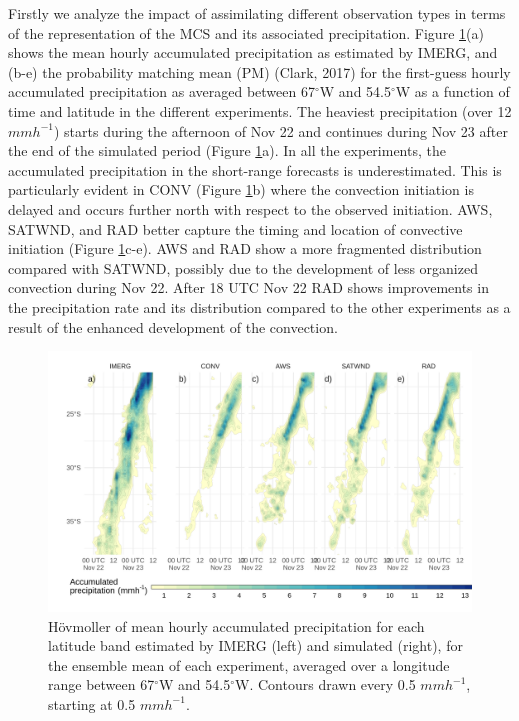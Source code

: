 \documentclass[final,5p,times,twocolumn,authoryear]{elsarticle} %
\begin{document}
Firstly we analyze the impact of assimilating different observation types in terms of the representation of the MCS and its associated precipitation. Figure \ref{fig:pp-hov}(a) shows the mean hourly accumulated precipitation as estimated by IMERG, and (b-e) the probability matching mean (PM) (Clark, 2017) for the first-guess hourly accumulated precipitation as averaged between 67\(^{\circ}\)W and 54.5\(^{\circ}\)W as a function of time and latitude in the different experiments. The heaviest precipitation (over 12 \(mmh^{-1}\)) starts during the afternoon of Nov 22 and continues during Nov 23 after the end of the simulated period (Figure \ref{fig:pp-hov}a). In all the experiments, the accumulated precipitation in the short-range forecasts is underestimated. This is particularly evident in CONV (Figure \ref{fig:pp-hov}b) where the convection initiation is delayed and occurs further north with respect to the observed initiation. AWS, SATWND, and RAD better capture the timing and location of convective initiation (Figure \ref{fig:pp-hov}c-e). AWS and RAD show a more fragmented distribution compared with SATWND, possibly due to the development of less organized convection during Nov 22. After 18 UTC Nov 22 RAD shows improvements in the precipitation rate and its distribution compared to the other experiments as a result of the enhanced development of the convection.



\begin{figure}[h]
\includegraphics{../figures/pp-hov-1} \caption{Hövmoller of mean hourly accumulated precipitation for each latitude band estimated by IMERG (left) and simulated (right), for the ensemble mean of each experiment, averaged over a longitude range between 67\(^{\circ}\)W and 54.5\(^{\circ}\)W. Contours drawn every 0.5 \(mmh^{-1}\), starting at 0.5 \(mmh^{-1}\).}\label{fig:pp-hov}
\end{figure}
\end{document}
